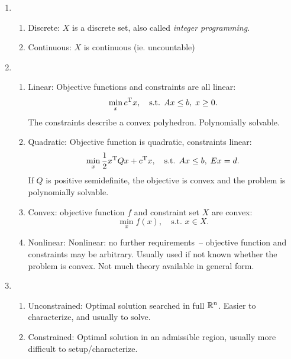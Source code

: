 \documentclass{article}
\begin{document}
\begin{enumerate}
\item
  \begin{enumerate}
  \item Discrete: \(X\) is a discrete set, also called \emph{integer programming}.
  \item Continuous: \(X\) is continuous (ie. uncountable)
  \end{enumerate}
\item
  \begin{enumerate}
  \item Linear: Objective functions and constraints are all linear:
    \begin{equation*}
      \min_x c^{\mathrm{T}} x, \quad\text{s.t. } Ax \leq b,\; x \geq 0.
    \end{equation*}
    The constraints describe a convex polyhedron.  Polynomially solvable.
  \item Quadratic: Objective function is quadratic, constraints linear:
    \begin{equation*}
      \min_x \frac{1}{2}x^{\mathrm{T}} Q x + c^{\mathrm{T}} x, \quad\text{s.t. } Ax \leq b,\; Ex = d.
    \end{equation*}
    If \(Q\) is positive semidefinite, the objective is convex and the problem is polynomially
    solvable.
  \item Convex: objective function \(f\) and constraint set \(X\) are convex:
    \begin{equation*}
      \min_x f(x), \quad\text{s.t. } x \in X.
    \end{equation*}
    \vspace{-1.5em}
  \item Nonlinear: Nonlinear: no further requirements~-- objective function and constraints may be
    arbitrary.  Usually used if not known whether the problem is convex.  Not much theory available
    in general form.
  \end{enumerate}
\item
  \begin{enumerate}
  \item Unconstrained: Optimal solution searched in full \(\mathbb{R}^n\). Easier to characterize, and
    usually to solve.
  \item Constrained: Optimal solution in an admissible region, usually more difficult to
    setup/characterize.
  \end{enumerate}
\end{enumerate}


\label{s:local-global-minima}
\end{document}
